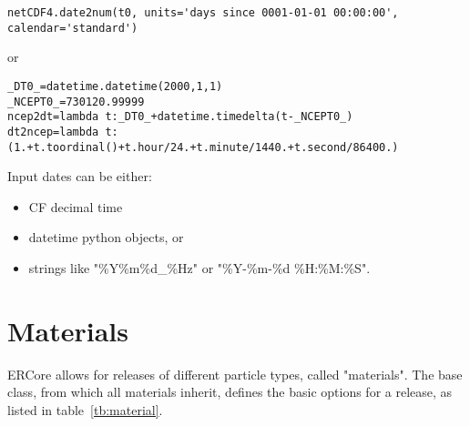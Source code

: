 \documentclass[a4paper]{article}
\begin{document}
\begin{Verbatim}[fontsize=\small]
netCDF4.date2num(t0, units='days since 0001-01-01 00:00:00', calendar='standard') 
\end{Verbatim}

or 

\begin{Verbatim}[fontsize=\small]
_DT0_=datetime.datetime(2000,1,1)
_NCEPT0_=730120.99999
ncep2dt=lambda t:_DT0_+datetime.timedelta(t-_NCEPT0_)
dt2ncep=lambda t: (1.+t.toordinal()+t.hour/24.+t.minute/1440.+t.second/86400.)
\end{Verbatim}


Input dates can be either:

\begin{itemize} 
\item CF decimal time
\item datetime python objects, or 
\item strings like "\%Y\%m\%d\_\%Hz" or "\%Y-\%m-\%d \%H:\%M:\%S".
\end{itemize} 



\section{Materials}
\label{sec:materials}


ERCore allows for releases of different particle types, called "materials". The base class, from which all materials inherit, defines the basic options for a release, as listed in table~\ref{tb:material}. 
\end{document}
